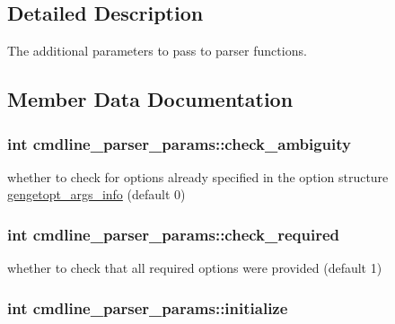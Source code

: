 \subsection{Detailed Description}
The additional parameters to pass to parser functions. 

\subsection{Member Data Documentation}
\hypertarget{structcmdline__parser__params_a6e4442704fc40b0b655f7cc602f13ec4}{
\subsubsection[{check\+\_\+ambiguity}]{\setlength{\rightskip}{0pt plus 5cm}int cmdline\+\_\+parser\+\_\+params\+::check\+\_\+ambiguity}}\label{structcmdline__parser__params_a6e4442704fc40b0b655f7cc602f13ec4}


whether to check for options already specified in the option structure \hyperlink{structgengetopt__args__info}{gengetopt\+\_\+args\+\_\+info} (default 0) 

\hypertarget{structcmdline__parser__params_a44ff439d7e9e36799e59173af74829c6}{
\subsubsection[{check\+\_\+required}]{\setlength{\rightskip}{0pt plus 5cm}int cmdline\+\_\+parser\+\_\+params\+::check\+\_\+required}}\label{structcmdline__parser__params_a44ff439d7e9e36799e59173af74829c6}


whether to check that all required options were provided (default 1) 

\hypertarget{structcmdline__parser__params_a97ed8a6eabd39291ae7d73f273e12c11}{
\subsubsection[{initialize}]{\setlength{\rightskip}{0pt plus 5cm}int cmdline\+\_\+parser\+\_\+params\+::initialize}}\label{structcmdline__parser__params_a97ed8a6eabd39291ae7d73f273e12c11}


